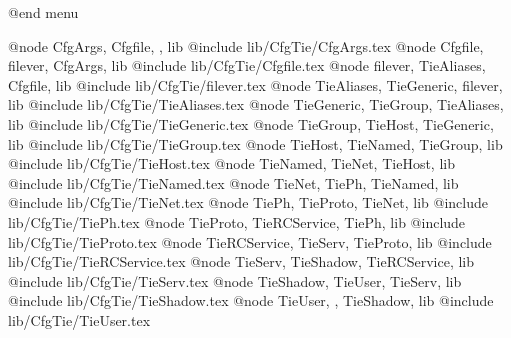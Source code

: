 @end menu

@node CfgArgs,	Cfgfile,	,	lib
@include lib/CfgTie/CfgArgs.tex
@node Cfgfile,	filever,	CfgArgs,	lib
@include lib/CfgTie/Cfgfile.tex
@node filever,	TieAliases,	Cfgfile,	lib
@include lib/CfgTie/filever.tex
@node TieAliases,	TieGeneric,	filever,	lib
@include lib/CfgTie/TieAliases.tex
@node TieGeneric,	TieGroup,	TieAliases,	lib
@include lib/CfgTie/TieGeneric.tex
@node TieGroup,	TieHost,	TieGeneric,	lib
@include lib/CfgTie/TieGroup.tex
@node TieHost,	TieNamed,	TieGroup,	lib
@include lib/CfgTie/TieHost.tex
@node TieNamed,	TieNet,	TieHost,	lib
@include lib/CfgTie/TieNamed.tex
@node TieNet,	TiePh,	TieNamed,	lib
@include lib/CfgTie/TieNet.tex
@node TiePh,	TieProto,	TieNet,	lib
@include lib/CfgTie/TiePh.tex
@node TieProto,	TieRCService,	TiePh,	lib
@include lib/CfgTie/TieProto.tex
@node TieRCService,	TieServ,	TieProto,	lib
@include lib/CfgTie/TieRCService.tex
@node TieServ,	TieShadow,	TieRCService,	lib
@include lib/CfgTie/TieServ.tex
@node TieShadow,	TieUser,	TieServ,	lib
@include lib/CfgTie/TieShadow.tex
@node TieUser,	,	TieShadow,	lib
@include lib/CfgTie/TieUser.tex
